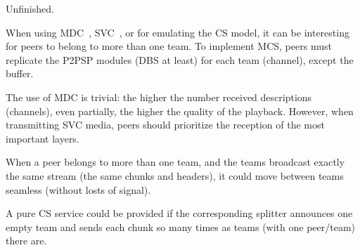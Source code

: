 
\label{sec:MCS}

\begin{notex}
  Unfinished.
\end{notex}

When using MDC~\cite{baccichet2007content}, SVC~\cite{chu2009auction},
or for emulating the CS model, it can be interesting for peers to
belong to more than one team. To implement MCS, peers must replicate
the P2PSP modules (DBS at least) for each team (channel), except the
buffer.

The use of MDC is trivial: the higher the number received descriptions
(channels), even partially, the higher the quality of the
playback. However, when transmitting SVC media, peers should
prioritize the reception of the most important layers.

When a peer belongs to more than one team, and the teams broadcast exactly
the same stream (the same chunks and headers), it could move between
teams seamless (without losts of signal).

A pure CS service could be provided if the corresponding splitter
announces one empty team and sends each chunk so many times as teams
(with one peer/team) there are.
